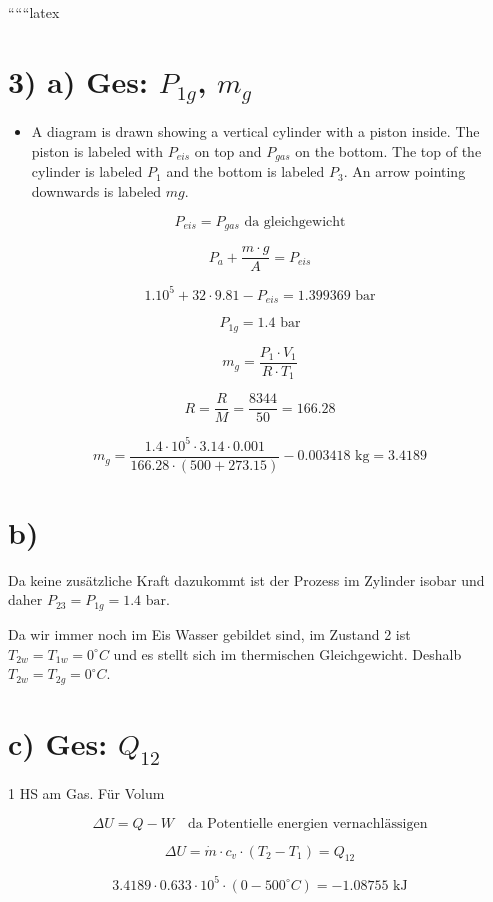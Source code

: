 
``````latex


\section*{3) a) Ges: $P_{1g}$, $m_g$}

\begin{itemize}
    \item A diagram is drawn showing a vertical cylinder with a piston inside. The piston is labeled with $P_{eis}$ on top and $P_{gas}$ on the bottom. The top of the cylinder is labeled $P_1$ and the bottom is labeled $P_3$. An arrow pointing downwards is labeled $mg$.
\end{itemize}

\[
P_{eis} = P_{gas} \text{ da gleichgewicht}
\]

\[
P_a + \frac{m \cdot g}{A} = P_{eis}
\]

\[
1.10^5 + 32 \cdot 9.81 - P_{eis} = 1.399369 \text{ bar}
\]

\[
P_{1g} = 1.4 \text{ bar}
\]

\[
m_g = \frac{P_1 \cdot V_1}{R \cdot T_1}
\]

\[
R = \frac{R}{M} = \frac{8344}{50} = 166.28
\]

\[
m_g = \frac{1.4 \cdot 10^5 \cdot 3.14 \cdot 0.001}{166.28 \cdot (500 + 273.15)} - 0.003418 \text{ kg} = 3.4189
\]

\section*{b)}

Da keine zusätzliche Kraft dazukommt ist der Prozess im Zylinder isobar und daher $P_{23} = P_{1g} = 1.4 \text{ bar}$.

Da wir immer noch im Eis Wasser gebildet sind, im Zustand 2 ist $T_{2w} = T_{1w} = 0^\circ C$ und es stellt sich im thermischen Gleichgewicht. Deshalb $T_{2w} = T_{2g} = 0^\circ C$.

\section*{c) Ges: $Q_{12}$}

1 HS am Gas. Für Volum

\[
\Delta U = Q - W \quad \text{da Potentielle energien vernachlässigen}
\]

\[
\Delta U = \dot{m} \cdot c_v \cdot (T_2 - T_1) = Q_{12}
\]

\[
3.4189 \cdot 0.633 \cdot 10^5 \cdot (0 - 500^\circ C) = -1.08755 \text{ kJ}
\]

